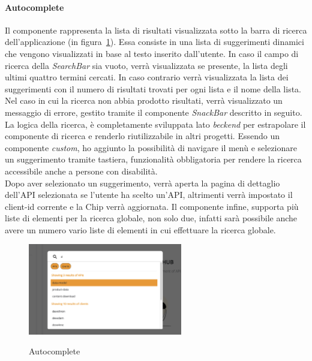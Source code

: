 \paragraph{Autocomplete}\label{par:autocomplete}
Il componente rappresenta la lista di risultati visualizzata sotto la barra di ricerca dell'applicazione (in figura~\ref{fig:autocomplete}).
Essa consiste in una lista di suggerimenti dinamici che vengono visualizzati in base al testo inserito dall'utente. 
In caso il campo di ricerca della \textit{SearchBar} sia vuoto, verrà visualizzata se presente, la lista degli ultimi quattro termini cercati.
In caso contrario verrà visualizzata la lista dei suggerimenti con il numero di risultati trovati per ogni lista e il nome della lista.
Nel caso in cui la ricerca non abbia prodotto risultati, verrà visualizzato un messaggio di errore, gestito tramite il componente \textit{SnackBar} descritto in seguito.
La logica della ricerca, è completamente sviluppata lato \textit{beckend} per estrapolare il componente di ricerca e renderlo riutilizzabile in altri progetti.
Essendo un componente \textit{custom}, ho aggiunto la possibilità di navigare il menù e selezionare un suggerimento tramite tastiera, funzionalità 
obbligatoria per rendere la ricerca accessibile anche a persone con disabilità.\\
Dopo aver selezionato un suggerimento, verrà aperta la pagina di dettaglio dell'API selezionata se l'utente ha scelto un'API, altrimenti verrà impostato il client-id corrente e la Chip verrà aggiornata.
Il componente infine, supporta più liste di elementi per la ricerca globale, non solo due, infatti sarà possibile anche avere un numero vario liste di elementi in cui effettuare
la ricerca globale. 

\begin{figure}[ht]
  \centering
  \includegraphics[width=0.6\textwidth, alt={Componente che si occupa della lista dinamica di risultati}]{images/frontend/SearchBar2.jpg}
  \caption{Autocomplete}\label{fig:autocomplete}
\end{figure}

